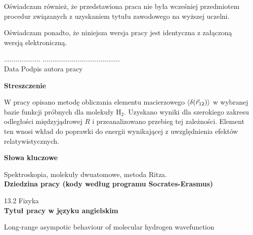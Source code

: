 \documentclass[a4paper,12pt]{article}
\numberwithin{equation}{section}
\numberwithin{table}{section}
\numberwithin{figure}{section}
\begin{document}
\noindent Oświadczam również, że przedstawiona praca nie była wcześniej przedmiotem procedur związanych z uzyskaniem tytułu zawodowego na wyższej uczelni.
\vspace{0.3cm}

\noindent Oświadczam ponadto, że niniejsza wersja pracy jest identyczna z załączoną wersją elektroniczną.
\vspace{1cm}

\noindent ................... \hfill ........................................\\
 Data \hfill Podpis autora pracy
\newpage
%
%
%
%
\newpage
\begin{center}
\textbf{Streszczenie}
\end{center}

W pracy opisano metodę obliczania elementu macierzowego $\braket{\delta({\vec{r}_{12}})}$  w wybranej bazie funkcji próbnych dla molekuły H$_2$. Uzyskano wyniki dla szerokiego zakresu odległości międzyjądrowej $R$ i przeanalizowano przebieg tej zależności. Element ten wnosi wkład do poprawki do energii wynikającej z uwzględnienia efektów relatywistycznych.
\vspace{2.5cm}
\begin{center}
\textbf{Słowa kluczowe}\vspace{0.3cm}

Spektroskopia, molekuły dwuatomowe, metoda Ritza.\\
\vspace{2.5cm}
\textbf{Dziedzina pracy (kody według programu Socrates-Erasmus)}\vspace{0.3cm}

13.2 Fizyka\\
\vspace{2.5cm}
\textbf{Tytuł pracy w języku angielskim}\vspace{0.3cm}

Long-range asympotic behaviour of molecular hydrogen wavefunction
\end{center}
\newpage

%
%
\end{document}
